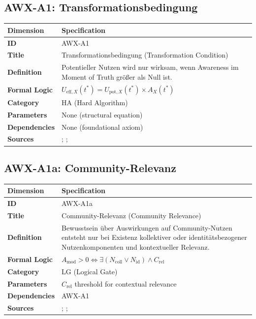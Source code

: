 \subsection{AWX-A1: Transformationsbedingung}

\begin{table}[htbp]
\small
\begin{tabular}{p{3cm}p{11cm}}
\toprule
\textbf{Dimension} & \textbf{Specification} \\
\midrule
\textbf{ID} & AWX-A1 \\
\textbf{Title} & Transformationsbedingung (Transformation Condition) \\
\textbf{Definition} & Potentieller Nutzen wird nur wirksam, wenn Awareness im Moment of Truth größer als Null ist. \\
\textbf{Formal Logic} & $U_{\text{eff},X}(t^*) = U_{\text{pot},X}(t^*) \times A_X(t^*)$ \\
\textbf{Category} & HA (Hard Algorithm) \\
\textbf{Parameters} & None (structural equation) \\
\textbf{Dependencies} & None (foundational axiom) \\
\textbf{Sources} & \citet{kahneman2003maps}; \citet{rangel2008framework}; \citet{fehr2011neuro} \\
\bottomrule
\end{tabular}
\end{table}


\subsection{AWX-A1a: Community-Relevanz}

\begin{table}[htbp]
\small
\begin{tabular}{p{3cm}p{11cm}}
\toprule
\textbf{Dimension} & \textbf{Specification} \\
\midrule
\textbf{ID} & AWX-A1a \\
\textbf{Title} & Community-Relevanz (Community Relevance) \\
\textbf{Definition} & Bewusstsein über Auswirkungen auf Community-Nutzen entsteht nur bei Existenz kollektiver oder identitätsbezogener Nutzenkomponenten und kontextueller Relevanz. \\
\textbf{Formal Logic} & $A_{\text{mod}} > 0 \Leftrightarrow \exists(N_{\text{coll}} \lor N_{\text{id}}) \land C_{\text{rel}}$ \\
\textbf{Category} & LG (Logical Gate) \\
\textbf{Parameters} & $C_{\text{rel}}$ threshold for contextual relevance \\
\textbf{Dependencies} & AWX-A1 \\
\textbf{Sources} & \citet{fehr1999theory}; \citet{fehr2004social}; \citet{akerlof2000identity} \\
\bottomrule
\end{tabular}
\end{table}


